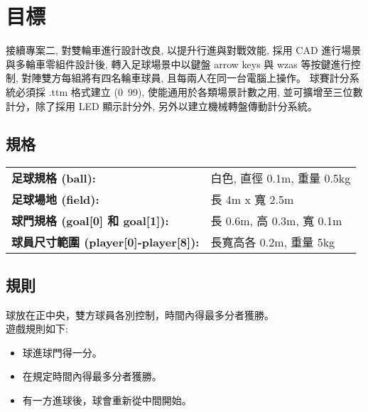 \chapter{目標}
接續專案二, 對雙輪車進行設計改良, 以提升行進與對戰效能, 採用 CAD 進行場景與多輪車零組件設計後, 轉入足球場景中以鍵盤 arrow keys 與 wzas 等按鍵進行控制, 對陣雙方每組將有四名輪車球員, 且每兩人在同一台電腦上操作。
球賽計分系統必須採 .ttm 格式建立 (0~99), 使能通用於各類場景計數之用, 並可擴增至三位數計分，除了採用 LED 顯示計分外, 另外以建立機械轉盤傳動計分系統。

\section{規格}
\begin{tabular}{p{8cm}p{20cm}}
  \textbf{足球規格 (ball):} & 白色, 直徑 0.1m, 重量 0.5kg \\
  \textbf{足球場地 (field):} & 長 4m x 寬 2.5m \\
  \textbf{球門規格 (goal[0] 和 goal[1]):} & 長 0.6m, 高 0.3m, 寬 0.1m \\
  \textbf{球員尺寸範圍 (player[0]-player[8]):} & 長寬高各 0.2m, 重量 5kg \\
\end{tabular}

\section{規則}
球放在正中央，雙方球員各別控制，時間內得最多分者獲勝。 \\
遊戲規則如下:
\begin{itemize}[label=\textbullet]
\item 球進球門得一分。
\item 在規定時間內得最多分者獲勝。
\item 有一方進球後，球會重新從中間開始。
\end{itemize}
